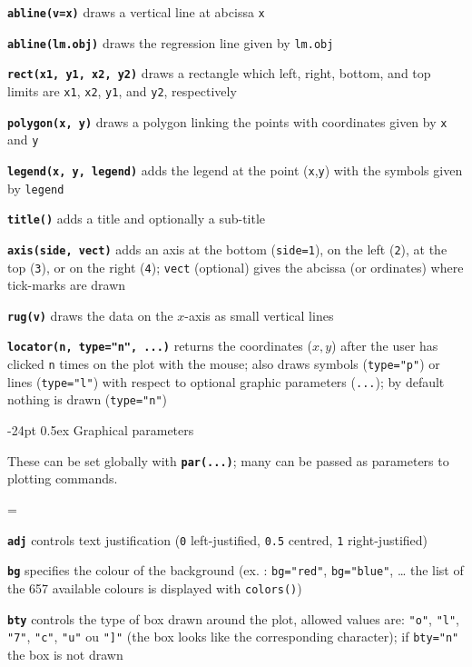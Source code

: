 \documentclass[8pt,landscape]{article}
\makeatletter
\renewcommand\section{\@startsection{section}{1}{0mm}%
                                     {-24pt}%
                                     {0.5ex}%
                                {\color{blue}\normalfont\large\bfseries}}
\newcommand{\code}{\texttt}
\newcommand{\bcode}[1]{\texttt{\textbf{#1}}}
\makeatother
\begin{document}
\begin{multicols*}{3}
\bcode{abline(v=x)}  draws a vertical line at abcissa \code{x}

\bcode{abline(lm.obj)}  draws the regression line given by \code{lm.obj}

\bcode{rect(x1, y1, x2, y2)}  draws a rectangle which left, right, bottom, and top limits are \code{x1}, \code{x2}, \code{y1}, and \code{y2}, respectively

\bcode{polygon(x, y)}  draws a polygon linking the points with coordinates given by \code{x} and \code{y}

\bcode{legend(x, y, legend)}  adds the legend at the point (\code{x},\code{y}) with the symbols given by \code{legend}

\bcode{title()}  adds a title and optionally a sub-title

\bcode{axis(side, vect)}  adds an axis at the bottom (\code{side=1}), on the left (\code{2}), at the top (\code{3}), or on the right (\code{4}); \code{vect} (optional) gives the abcissa (or ordinates) where tick-marks are drawn

\bcode{rug(v)}  draws the data on the $x$-axis as small vertical lines

\bcode{locator(n, type="n", ...)}  returns the coordinates ($x,y$) after the user has clicked \code{n} times on the plot with the mouse; also draws symbols (\code{type="p"}) or lines (\code{type="l"}) with respect to optional graphic parameters (\code{...}); by default nothing is drawn (\code{type="n"})




\section{Graphical parameters}

These can be set globally with \bcode{par(...)}; many can be passed as
parameters to plotting commands.

\everypar={\hangindent=9mm}

\bcode{adj}  controls text justification (\code{0} left-justified, \code{0.5} centred, \code{1} right-justified)

\bcode{bg}  specifies the colour of the background (ex. : \code{bg="red"}, \code{bg="blue"}, \ldots{} the list of the 657 available colours is displayed with \code{colors()})

\bcode{bty}  controls the type of box drawn around the plot, allowed values are: \code{"o"}, \code{"l"}, \code{"7"}, \code{"c"}, \code{"u"} ou \code{"]"} (the box looks like the corresponding character); if \code{bty="n"} the box is not drawn


\end{multicols*}
\end{document}
